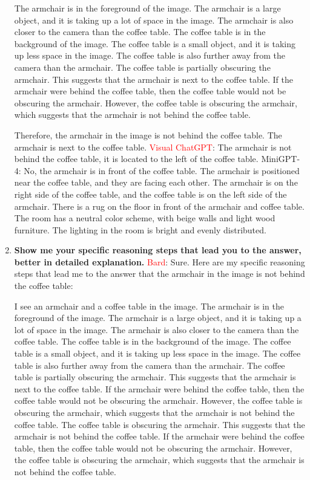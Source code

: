 \begin{enumerate}
    The armchair is in the foreground of the image. The armchair is a large object, and it is taking up a lot of space in the image. The armchair is also closer to the camera than the coffee table.
    The coffee table is in the background of the image. The coffee table is a small object, and it is taking up less space in the image. The coffee table is also further away from the camera than the armchair.
    The coffee table is partially obscuring the armchair. This suggests that the armchair is next to the coffee table.
    If the armchair were behind the coffee table, then the coffee table would not be obscuring the armchair. However, the coffee table is obscuring the armchair, which suggests that the armchair is not behind the coffee table.
    
    Therefore, the armchair in the image is not behind the coffee table. The armchair is next to the coffee table.
    \subitem \textcolor{red}{Visual ChatGPT}: The armchair is not behind the coffee table, it is located to the left of the coffee table.
    \subitem MiniGPT-4: No, the armchair is in front of the coffee table. The armchair is positioned near the coffee table, and they are facing each other. The armchair is on the right side of the coffee table, and the coffee table is on the left side of the armchair. There is a rug on the floor in front of the armchair and coffee table. The room has a neutral color scheme, with beige walls and light wood furniture. The lighting in the room is bright and evenly distributed.
    \item \textbf{Show me your specific reasoning steps that lead you to the answer, better in detailed explanation.}
    \subitem \textcolor{Red}{Bard}: 
    Sure. Here are my specific reasoning steps that lead me to the answer that the armchair in the image is not behind the coffee table:
    
    I see an armchair and a coffee table in the image.
    The armchair is in the foreground of the image. The armchair is a large object, and it is taking up a lot of space in the image. The armchair is also closer to the camera than the coffee table.
    The coffee table is in the background of the image. The coffee table is a small object, and it is taking up less space in the image. The coffee table is also further away from the camera than the armchair.
    The coffee table is partially obscuring the armchair. This suggests that the armchair is next to the coffee table.
    If the armchair were behind the coffee table, then the coffee table would not be obscuring the armchair. However, the coffee table is obscuring the armchair, which suggests that the armchair is not behind the coffee table.
    The coffee table is obscuring the armchair. This suggests that the armchair is not behind the coffee table. If the armchair were behind the coffee table, then the coffee table would not be obscuring the armchair. However, the coffee table is obscuring the armchair, which suggests that the armchair is not behind the coffee table.
    

\end{enumerate}
